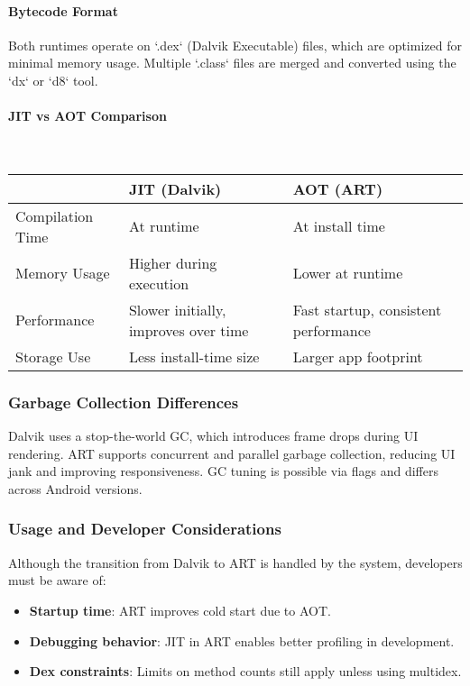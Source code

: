 \documentclass[a4paper,12pt]{article}
\begin{document}
\paragraph{Bytecode Format}
Both runtimes operate on `.dex` (Dalvik Executable) files, which are optimized for minimal memory usage. Multiple `.class` files are merged and converted using the `dx` or `d8` tool.

\paragraph{JIT vs AOT Comparison}\mbox{}\\

\begin{tabular}{|l|l|l|}
\hline
 & \textbf{JIT (Dalvik)} & \textbf{AOT (ART)} \\
\hline
Compilation Time & At runtime & At install time \\
Memory Usage & Higher during execution & Lower at runtime \\
Performance & Slower initially, improves over time & Fast startup, consistent performance \\
Storage Use & Less install-time size & Larger app footprint \\
\hline
\end{tabular}

\subsubsection{Garbage Collection Differences}

Dalvik uses a stop-the-world GC, which introduces frame drops during UI rendering. ART supports concurrent and parallel garbage collection, reducing UI jank and improving responsiveness. GC tuning is possible via flags and differs across Android versions.

\subsubsection{Usage and Developer Considerations}

Although the transition from Dalvik to ART is handled by the system, developers must be aware of:
\begin{itemize}
  \item \textbf{Startup time}: ART improves cold start due to AOT.
  \item \textbf{Debugging behavior}: JIT in ART enables better profiling in development.
  \item \textbf{Dex constraints}: Limits on method counts still apply unless using multidex.
\end{itemize}
\end{document}
